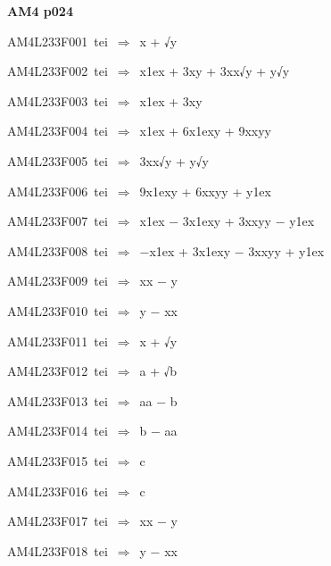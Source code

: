 \par\vfill\eject
{\bf\hfill AM4 p024\hfill\hbox{}}\par\bigskip
{\sixrm AM4L233F001\ {\sixit tei}\ }$\Rightarrow$\ {\tenit x} + √{\tenit y}\par\smallskip
{\sixrm AM4L233F002\ {\sixit tei}\ }$\Rightarrow$\ {\tenit x}\raise1ex\hbox{} + 3{\tenit xy} + 3{\tenit xx}√{\tenit y} + {\tenit y}√{\tenit y}\par\smallskip
{\sixrm AM4L233F003\ {\sixit tei}\ }$\Rightarrow$\ {\tenit x}\raise1ex\hbox{} + 3{\tenit xy}\par\smallskip
{\sixrm AM4L233F004\ {\sixit tei}\ }$\Rightarrow$\ {\tenit x}\raise1ex\hbox{} + 6{\tenit x}\raise1ex\hbox{}{\tenit y} + 9{\tenit xxyy}\par\smallskip
{\sixrm AM4L233F005\ {\sixit tei}\ }$\Rightarrow$\ 3{\tenit xx}√{\tenit y} + {\tenit y}√{\tenit y}\par\smallskip
{\sixrm AM4L233F006\ {\sixit tei}\ }$\Rightarrow$\ 9{\tenit x}\raise1ex\hbox{}{\tenit y} + 6{\tenit xxyy} + {\tenit y}\raise1ex\hbox{}\par\smallskip
{\sixrm AM4L233F007\ {\sixit tei}\ }$\Rightarrow$\ {\tenit x}\raise1ex\hbox{} − 3{\tenit x}\raise1ex\hbox{}{\tenit y} + 3{\tenit xxyy} − {\tenit y}\raise1ex\hbox{}\par\smallskip
{\sixrm AM4L233F008\ {\sixit tei}\ }$\Rightarrow$\ −{\tenit x}\raise1ex\hbox{} + 3{\tenit x}\raise1ex\hbox{}{\tenit y} − 3{\tenit xxyy} + {\tenit y}\raise1ex\hbox{}\par\smallskip
{\sixrm AM4L233F009\ {\sixit tei}\ }$\Rightarrow$\ {\tenit xx} − {\tenit y}\par\smallskip
{\sixrm AM4L233F010\ {\sixit tei}\ }$\Rightarrow$\ {\tenit y} − {\tenit xx}\par\smallskip
{\sixrm AM4L233F011\ {\sixit tei}\ }$\Rightarrow$\ {\tenit x} + √{\tenit y}\par\smallskip
{\sixrm AM4L233F012\ {\sixit tei}\ }$\Rightarrow$\ {\tenit a} + √{\tenit b}\par\smallskip
{\sixrm AM4L233F013\ {\sixit tei}\ }$\Rightarrow$\ {\tenit aa} − {\tenit b}\par\smallskip
{\sixrm AM4L233F014\ {\sixit tei}\ }$\Rightarrow$\ {\tenit b} − {\tenit aa}\par\smallskip
{\sixrm AM4L233F015\ {\sixit tei}\ }$\Rightarrow$\ {\tenit c}\par\smallskip
{\sixrm AM4L233F016\ {\sixit tei}\ }$\Rightarrow$\ {\tenit c}\par\smallskip
{\sixrm AM4L233F017\ {\sixit tei}\ }$\Rightarrow$\ {\tenit xx} − {\tenit y}\par\smallskip
{\sixrm AM4L233F018\ {\sixit tei}\ }$\Rightarrow$\ {\tenit y} − {\tenit xx}\par\smallskip

